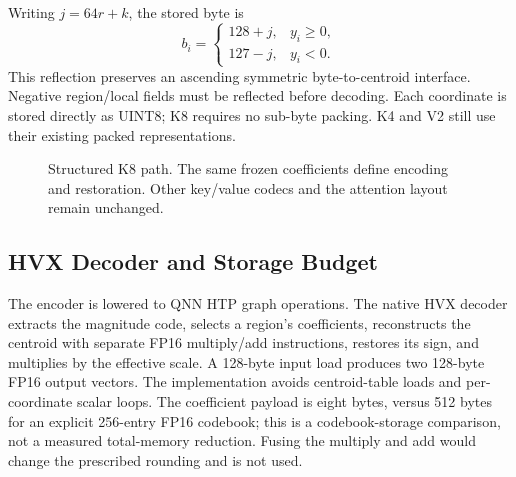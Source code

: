 \documentclass[conference,a4paper,10pt]{IEEEtran}
\begin{document}
Writing $j=64r+k$, the stored byte is
\begin{equation}
 b_i=\begin{cases}
 128+j,&y_i\geq0,\\
 127-j,&y_i<0.
 \end{cases}
 \label{eq:byte}
\end{equation}
This reflection preserves an ascending symmetric byte-to-centroid interface. Negative region/local fields must be reflected before decoding. Each coordinate is stored directly as UINT8; K8 requires no sub-byte packing. K4 and V2 still use their existing packed representations.

\begin{figure}[t]
\centering
{}
\caption{Structured K8 path. The same frozen coefficients define encoding and restoration. Other key/value codecs and the attention layout remain unchanged.}
\label{fig:path}
\end{figure}

\subsection{HVX Decoder and Storage Budget}
The encoder is lowered to QNN HTP graph operations. The native HVX decoder extracts the magnitude code, selects a region's coefficients, reconstructs the centroid with separate FP16 multiply/add instructions, restores its sign, and multiplies by the effective scale. A 128-byte input load produces two 128-byte FP16 output vectors. The implementation avoids centroid-table loads and per-coordinate scalar loops. The coefficient payload is eight bytes, versus 512 bytes for an explicit 256-entry FP16 codebook; this is a codebook-storage comparison, not a measured total-memory reduction. Fusing the multiply and add would change the prescribed rounding and is not used.
\end{document}
